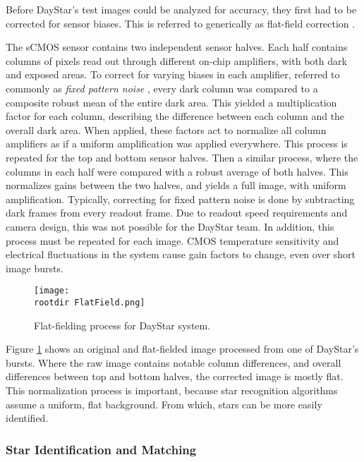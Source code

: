 \documentclass[twocolumn,letterpaper]{IEEEAerospace2012}
\newcommand{\rootdir}{./Figures/}
\begin{document}
Before DayStar's test images could be analyzed for accuracy, they first had to be corrected for sensor biases. This is referred to generically as flat-field correction \cite{flatfield}. 

The sCMOS sensor contains two independent sensor halves. Each half contains columns of pixels read out through different on-chip amplifiers, with both dark and exposed areas. To correct for varying biases in each amplifier, referred to commonly as \emph{fixed pattern noise} \cite{olympusmicro}, every dark column was compared to a composite robust mean of the entire dark area. This yielded a multiplication factor for each column, describing the difference between each column and the overall dark area. When applied, these factors act to normalize all column amplifiers as if a uniform amplification was applied everywhere. This process is repeated for the top and bottom sensor halves. Then a similar process, where the columns in each half were compared with a robust average of both halves. This normalizes gains between the two halves, and yields a full image, with uniform amplification. Typically, correcting for fixed pattern noise is done by subtracting dark frames from every readout frame. Due to readout speed 
requirements and camera design, this was not possible for the DayStar team. In addition, this process must be repeated for each image. CMOS temperature sensitivity and electrical fluctuations in the system cause gain factors to change, even over short image bursts. 

\begin{figure}
    \centering
    \texttt{[image: \\rootdir FlatField.png]}
    \caption{Flat-fielding process for DayStar system.}
    \label{fig:FlatField}
\end{figure}

Figure \ref{fig:FlatField} shows an original and flat-fielded image processed from one of DayStar's bursts. Where the raw image contains notable column differences, and overall differences between top and bottom halves, the corrected image is mostly flat. This normalization process is important, because star recognition algorithms assume a uniform, flat background. From which, stars can be more easily identified. 

\subsubsection{Star Identification and Matching}
\end{document}
